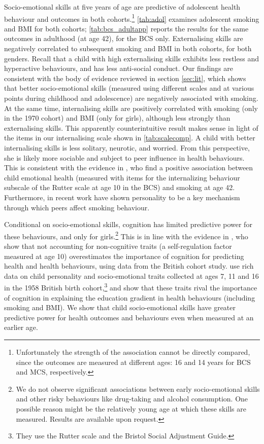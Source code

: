 Socio-emotional skills at five years of age are predictive of adolescent health behaviour and outcomes in both cohorts.\footnote{Unfortunately the strength of the association cannot be directly compared, since the outcomes are measured at different ages: 16 and 14 years for BCS and MCS, respectively.} \autoref{tab:adol} examines adolescent smoking and BMI for both cohorts; \autoref{tab:bcs_adultapp} reports the results for the same outcomes in adulthood (at age 42), for the BCS only. Externalising skills are negatively correlated to subsequent smoking and BMI in both cohorts, for both genders. Recall that a child with high externalising skills exhibits less restless and hyperactive behaviours, and has less anti-social conduct. Our findings are consistent with the body of evidence reviewed in section \ref{sec:lit}, which shows that better socio-emotional skills (measured using different scales and at various points during childhood and adolescence) are negatively associated with smoking. At the same time, internalising skills are positively correlated with smoking (only in the 1970 cohort) and BMI (only for girls), although less strongly than externalising skills. This apparently counterintuitive result makes sense in light of the items in our internalising scale shown in \autoref{tab:scalecomp}. A child with better internalising skills is less solitary, neurotic, and worried. From this perspective, she is likely more sociable and subject to peer influence in health behaviours. This is consistent with the evidence in \citet{Goodman2015}, who find a positive association between child emotional health (measured with items for the internalizing behaviour subscale of the Rutter scale at age 10 in the BCS) and smoking at age 42. Furthermore, in recent work \citet{Hsieh2018} have shown personality to be a key mechanism through which peers affect smoking behaviour.

Conditional on socio-emotional skills, cognition has limited predictive power for these behaviours, and only for girls.\footnote{We do not observe significant associations between early socio-emotional skills and other risky behaviours like drug-taking and alcohol consumption. One possible reason might be the relatively young age at which these skills are measured. Results are available upon request.} This is in line with the evidence in \citet{Conti2010}, who show that not accounting for non-cognitive traits (a self-regulation factor measured at age 10) overestimates the importance of cognition for predicting health and health behaviours, using data from the British cohort study. \citet{Conti2013a} use rich data on child personality and socio-emotional traits collected at ages 7, 11 and 16 in the 1958 British birth cohort,\footnote{They use the Rutter scale and the Bristol Social Adjustment Guide.} and show that these traits rival the importance of cognition in explaining the education gradient in health behaviours (including smoking and BMI). We show that child socio-emotional skills have greater predictive power for health outcomes and behaviours even when measured at an earlier age.



